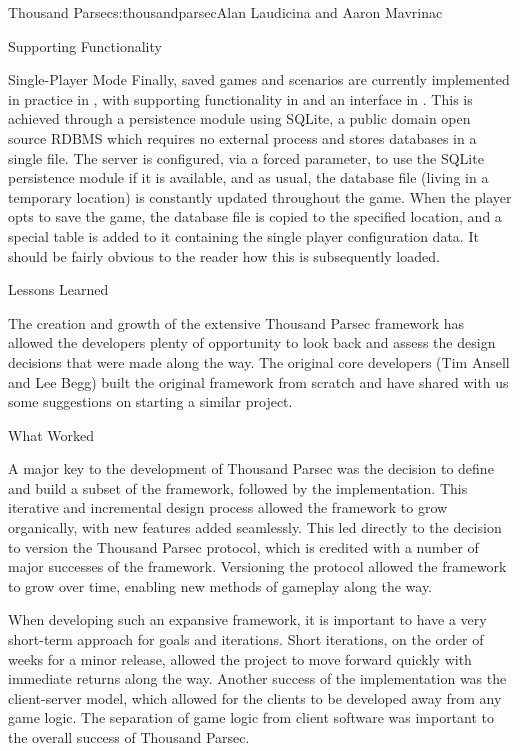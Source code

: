 \begin{aosachapter}{Thousand Parsec}{s:thousandparsec}{Alan Laudicina and Aaron Mavrinac}
\begin{aosasect1}{Supporting Functionality}
\begin{aosasect2}{Single-Player Mode}
Finally, saved games and scenarios are currently implemented in
practice in , with supporting functionality in
 and an interface in . This
is achieved through a persistence module using SQLite, a public domain
open source RDBMS which requires no external process and stores
databases in a single file. The server is configured, via a forced
parameter, to use the SQLite persistence module if it is available,
and as usual, the database file (living in a temporary location) is
constantly updated throughout the game. When the player opts to save
the game, the database file is copied to the specified location, and a
special table is added to it containing the single player
configuration data. It should be fairly obvious to the reader how this
is subsequently loaded.

\end{aosasect2}

\end{aosasect1}

\begin{aosasect1}{Lessons Learned}

The creation and growth of the extensive Thousand Parsec framework has
allowed the developers plenty of opportunity to look back and assess
the design decisions that were made along the way. The original core
developers (Tim Ansell and Lee Begg) built the original framework from
scratch and have shared with us some suggestions on starting a similar
project.

\begin{aosasect2}{What Worked}

A major key to the development of Thousand Parsec was the decision to
define and build a subset of the framework, followed by the
implementation. This iterative and incremental design process allowed
the framework to grow organically, with new features added
seamlessly. This led directly to the decision to version the
Thousand Parsec protocol, which is credited with a number of major
successes of the framework. Versioning the protocol allowed the
framework to grow over time, enabling new methods of gameplay along
the way.

When developing such an expansive framework, it is important to have a
very short-term approach for goals and iterations. Short iterations, on the order of weeks for a minor release,
allowed the project to move forward quickly with immediate returns
along the way. Another success of the
implementation was the client-server model, which allowed for the
clients to be developed away from any game logic. The separation of
game logic from client software was important to the overall success
of Thousand Parsec.


\end{aosasect2}
\end{aosasect1}
\end{aosachapter}
